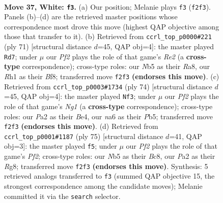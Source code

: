 \documentclass[11pt]{article}
\begin{document}
\clearpage

\begin{figure}[p]\centering
\begin{subfigure}{0.46\textwidth}\centering
\resizebox{\linewidth}{!}{%
\newchessgame
\chessboard[
  setfen={6r1/1p1kp2p/n5p1/pNp5/5P1P/2P5/P4PK1/n1B4R w - - 2 37},
  showmover=false,
  pgfstyle=straightmove, color=movearrow, markmove={f2-f3}
]}
\caption{}
\end{subfigure}\hfill
\begin{subfigure}{0.46\textwidth}\centering
\resizebox{\linewidth}{!}{%
\newchessgame
\chessboard[
  setfen={r4bk1/4rp1p/6p1/1Rp1p3/2P4P/4PP2/2R3P1/5NK1 b - - 2 36},
  showmover=false,
  pgfstyle=straightmove, color=movearrow, markmove={e7-d7}
]}
\caption{}
\end{subfigure}
\\[4pt]
\begin{subfigure}{0.46\textwidth}\centering
\resizebox{\linewidth}{!}{%
\newchessgame
\chessboard[
  setfen={1b6/p3kp2/1p2p2p/1P5n/PP2B3/8/3r1PP1/4RKN1 w - - 0 38},
  showmover=false,
  pgfstyle=straightmove, color=movearrow, markmove={g1-f3}
]}
\caption{}
\end{subfigure}\hfill
\begin{subfigure}{0.46\textwidth}\centering
\resizebox{\linewidth}{!}{%
\newchessgame
\chessboard[
  setfen={2b3r1/p4p2/2pk4/3p2p1/1P4Pp/PNP2P2/3K3P/6R1 b - - 0 38},
  showmover=false,
  pgfstyle=straightmove, color=movearrow, markmove={f7-f5}
]}
\caption{}
\end{subfigure}
\caption{\textbf{Move 37, White: \texttt{f3}.} (a) Our position; Melanie plays \texttt{f3} (\texttt{f2f3}). Panels (b)--(d) are the retrieved master positions whose correspondence most drove this move (highest QAP objective among those that transfer to it). (b) Retrieved from \texttt{ccrl\_top\_p0000\#221} (ply 71) [structural distance $d$=45, QAP obj=4]: the master played \texttt{Rd7}; under $\mu$ our \emph{Pf2} plays the role of that game's \emph{Re2} (a \textbf{cross-type} correspondence); cross-type roles: our \emph{N}b5 as their \emph{R}a8, our \emph{R}h1 as their \emph{B}f8; transferred move \texttt{f2f3} \textbf{(endorses this move)}. (c) Retrieved from \texttt{ccrl\_top\_p0003\#1734} (ply 74) [structural distance $d$=45, QAP obj=4]: the master played \texttt{Nf3}; under $\mu$ our \emph{Pf2} plays the role of that game's \emph{Ng1} (a \textbf{cross-type} correspondence); cross-type roles: our \emph{P}a2 as their \emph{B}e4, our \emph{n}a6 as their \emph{P}b5; transferred move \texttt{f2f3} \textbf{(endorses this move)}. (d) Retrieved from \texttt{ccrl\_top\_p0001\#1187} (ply 75) [structural distance $d$=41, QAP obj=3]: the master played \texttt{f5}; under $\mu$ our \emph{Pf2} plays the role of that game's \emph{Pf2}; cross-type roles: our \emph{N}b5 as their \emph{B}c8, our \emph{P}a2 as their \emph{R}g8; transferred move \texttt{f2f3} \textbf{(endorses this move)}. Synthesis: 5 retrieved analogs transferred to \texttt{f3} (summed QAP objective 15, the strongest correspondence among the candidate moves); Melanie committed it via the \texttt{search} selector.}
\label{fig:thought-m72}
\end{figure}
\end{document}
